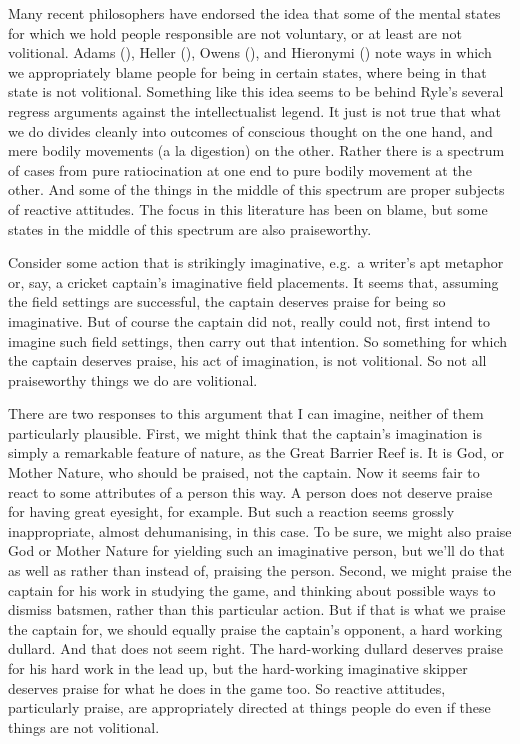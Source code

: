 \documentclass[
  11pt,
  letterpaper,
  DIV=11,
  numbers=noendperiod,
  oneside]{scrartcl}
\begin{document}
Many recent philosophers have endorsed the idea that some of the mental
states for which we hold people responsible are not voluntary, or at
least are not volitional. Adams (), Heller
(), Owens
(), and Hieronymi
() note ways in which we appropriately
blame people for being in certain states, where being in that state is
not volitional. Something like this idea seems to be behind Ryle's
several regress arguments against the intellectualist legend. It just is
not true that what we do divides cleanly into outcomes of conscious
thought on the one hand, and mere bodily movements (a la digestion) on
the other. Rather there is a
spectrum of cases from pure ratiocination at one end to pure bodily
movement at the other. And some of the things in the middle of this
spectrum are proper subjects of reactive attitudes. The focus in this
literature has been on blame, but some states in the middle of this
spectrum are also praiseworthy.

Consider some action that is strikingly imaginative, e.g.~a writer's apt
metaphor or, say, a cricket captain's imaginative field placements. It
seems that, assuming the field settings are successful, the captain
deserves praise for being so imaginative. But of course the captain did
not, really could not, first intend to imagine such field settings, then
carry out that intention. So something for which the captain deserves
praise, his act of imagination, is not volitional. So not all
praiseworthy things we do are volitional.

There are two responses to this argument that I can imagine, neither of
them particularly plausible. First, we might think that the captain's
imagination is simply a remarkable feature of nature, as the Great
Barrier Reef is. It is God, or Mother Nature, who should be praised, not
the captain. Now it seems fair to react to some attributes of a person
this way. A person does not deserve praise for having great eyesight,
for example. But such a reaction seems grossly inappropriate, almost
dehumanising, in this case. To be sure, we might also praise God or
Mother Nature for yielding such an imaginative person, but we'll do that
as well as rather than instead of, praising the person. Second, we might
praise the captain for his work in studying the game, and thinking about
possible ways to dismiss batsmen, rather than this particular action.
But if that is what we praise the captain for, we should equally praise
the captain's opponent, a hard working dullard. And that does not seem
right. The hard-working dullard deserves praise for his hard work in the
lead up, but the hard-working imaginative skipper deserves praise for
what he does in the game too. So reactive attitudes, particularly
praise, are appropriately directed at things people do even if these
things are not volitional.
\end{document}
